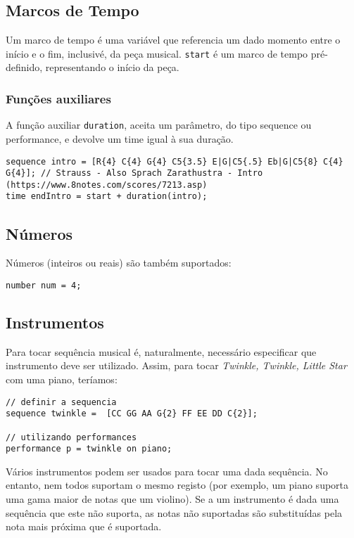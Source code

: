 \documentclass{article}
\begin{document}
\subsection{Marcos de Tempo}
Um marco de tempo é uma variável que referencia um dado momento entre o início e o fim, inclusivé, da peça musical. \texttt{start} é um marco de tempo pré-definido, representando o início da peça. 
\subsubsection{Funções auxiliares}
A função auxiliar \texttt{duration}, aceita um parâmetro, do tipo sequence ou performance, e devolve um time igual à sua duração.
\begin{lstlisting} 
sequence intro = [R{4} C{4} G{4} C5{3.5} E|G|C5{.5} Eb|G|C5{8} C{4} G{4}]; // Strauss - Also Sprach Zarathustra - Intro (https://www.8notes.com/scores/7213.asp)
time endIntro = start + duration(intro);
\end{lstlisting}

\subsection{Números}
Números (inteiros ou reais) são também suportados:
\begin{lstlisting} 
number num = 4;
\end{lstlisting}

\subsection{Instrumentos}
Para tocar sequência musical é, naturalmente, necessário especificar que instrumento deve ser utilizado. Assim, para tocar \textit{Twinkle, Twinkle, Little Star} com uma piano, teríamos:
\begin{lstlisting} 
// definir a sequencia
sequence twinkle =  [CC GG AA G{2} FF EE DD C{2}];

// utilizando performances
performance p = twinkle on piano;
\end{lstlisting}

Vários instrumentos podem ser usados para tocar uma dada sequência. No entanto, nem todos suportam o mesmo registo (por exemplo, um piano suporta uma gama maior de notas que um violino). Se a um instrumento é dada uma sequência que este não suporta, as notas não suportadas são substituídas pela nota mais próxima que é suportada. %
\end{document}
